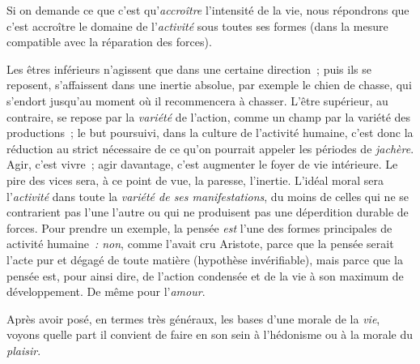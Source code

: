 \documentclass[french,twoside]{book} %
\begin{document}
Si on demande ce que c’est qu’\emph{accroître} l’intensité de la vie, nous répondrons que c’est accroître le domaine de l’\emph{activité} sous toutes ses formes (dans la mesure compatible avec la réparation des forces).\par
Les êtres inférieurs n’agissent que dans une certaine direction ; puis ils se reposent, s’affaissent dans une inertie absolue, par exemple le chien de chasse, qui s’endort jusqu’au moment où il recommencera à chasser. L’être supérieur, au contraire, se repose par la \emph{variété} de l’action, comme un champ par la variété des productions ; le but poursuivi, dans la culture de l’activité humaine, c’est donc la réduction au strict nécessaire de ce qu’on pourrait appeler les périodes de \emph{jachère}. Agir, c’est vivre ; agir davantage, c’est augmenter le foyer de vie intérieure. Le pire des vices sera, à ce point de vue, la paresse, l’inertie. L’idéal moral sera l’\emph{activité} dans toute la \emph{variété de ses manifestations}, du moins de celles qui ne se contrarient pas l’une l’autre ou qui ne produisent pas une déperdition durable de forces. Pour prendre un exemple, la pensée \emph{est} l’une des formes principales de activité humaine \emph{: non}, comme l’avait cru Aristote, parce que la pensée serait l’acte pur et dégagé de toute matière (hypothèse invérifiable), mais parce que la pensée est, pour ainsi dire, de l’action condensée et de la vie à son maximum de développement. De même pour l’\emph{amour}.\par
Après avoir posé, en termes très généraux, les bases d’une morale de la \emph{vie}, voyons quelle part il convient de faire en son sein à l’hédonisme ou à la morale du \emph{plaisir}.\par
\end{document}
